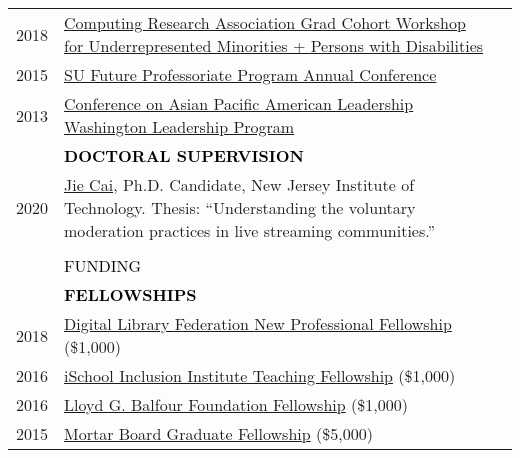 \documentclass[11pt]{article}
\begin{document}
{{\begin{longtable}{Rp{0.75in}p{5.0in}}
\footnotesize{2018} & \href{https://cra.org/events/urmgradcohort/}{{Computing Research Association Grad Cohort Workshop for Underrepresented Minorities + Persons with Disabilities}}\\

\footnotesize{2015} & \href{http://graduateschool.syr.edu/programs/future-professoriate-program/}{{SU Future Professoriate Program Annual Conference}}\\

\footnotesize{2013} & \href{https://www.capal.org/programs/wlp/}{Conference on Asian Pacific American Leadership Washington Leadership Program}\\

& \textcolor{black}{\uppercase{\textbf{Doctoral  Supervision}}}\\

\footnotesize{2020} & \href{https://jc926.github.io/Jie_Cai/}{Jie Cai}, Ph.D. Candidate, New Jersey Institute of Technology. \newline
Thesis: ``Understanding the voluntary moderation practices in live streaming communities.''\\

\\

\sout{\hfill} & \par \Large \textcolor{black}{\uppercase{Funding\hspace{6pt} \sout{\hfill}}}\\

& \textcolor{black}{\uppercase{\textbf{Fellowships}}}\\

\footnotesize{2018} & \href{https://forum2018.diglib.org/fellowship-opportunities/fellows/}{{Digital Library Federation New Professional Fellowship}} (\$1,000)\\

\footnotesize{2016} & \href{http://www.sis.pitt.edu/i3/phd-fellows/fellow-profiles.html}{{iSchool Inclusion Institute Teaching Fellowship}} (\$1,000)\\

\footnotesize{2016} & \href{https://www.bankofamerica.com/philanthropic/foundation.go?fnId=31}{{Lloyd G. Balfour Foundation Fellowship}} (\$1,000)\\

\footnotesize{2015} & \href{https://news.syr.edu/2015/07/ischool-student-awarded-5000-mortar-board-fellowship-22021/}{{Mortar Board Graduate Fellowship}} (\$5,000)\\


\end{longtable}}}
\end{document}
